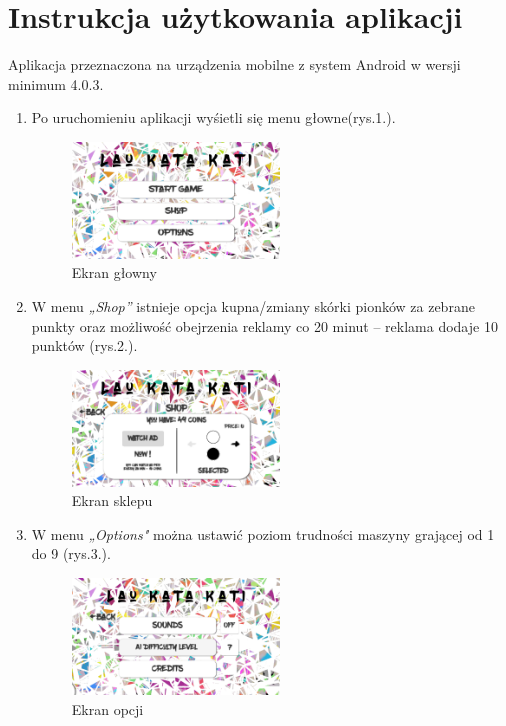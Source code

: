 \newpage\section{Instrukcja użytkowania aplikacji}
Aplikacja przeznaczona na urządzenia mobilne z system Android w wersji minimum 4.0.3.

\begin{enumerate}
	\item Po uruchomieniu aplikacji wyśietli się menu głowne(rys.1.).
	\begin{figure}[ht!]
		\centering
		\includegraphics[width=55mm]{img/ekran_glowny.png}
		\caption{Ekran głowny}
	\end{figure}

	\item W menu \textit{„Shop”} istnieje opcja kupna/zmiany skórki pionków za zebrane punkty oraz możliwość obejrzenia reklamy co 20 minut – reklama dodaje 10 punktów (rys.2.).
	\begin{figure}[ht!]
		\centering
		\includegraphics[width=55mm]{img/sklep.png}
		\caption{Ekran sklepu}
	\end{figure}
	
	\item W menu \textit{„Options"} można ustawić poziom trudności maszyny grającej od 1 do 9 (rys.3.).
	\begin{figure}[ht!]
		\centering
		\includegraphics[width=55mm]{img/opcje.png}
		\caption{Ekran opcji}
	\end{figure}
	

\end{enumerate}
